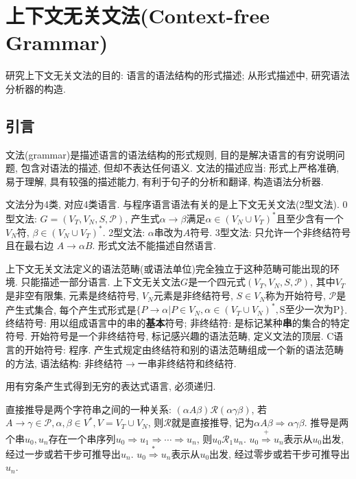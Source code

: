 \section{上下文无关文法(Context-free Grammar)}

    研究上下文无关文法的目的: 语言的语法结构的形式描述; 从形式描述中, 研究语法分析器的构造.

    \subsection{引言}

        \textsf{文法(grammar)}是描述语言的语法结构的形式规则, 目的是解决语言的有穷说明问题, 包含对语法的描述, 但却不表达任何语义. 文法的描述应当: 形式上严格准确, 易于理解, 具有较强的描述能力, 有利于句子的分析和翻译, 构造语法分析器.

        文法分为4类, 对应4类语言. 与程序语言语法有关的是上下文无关文法(2型文法). 0型文法: $G=(V_T, V_N, S, \mathcal{P})$, 产生式$\alpha\to\beta$满足$\alpha\in(V_N\cup V_T)^*$且至少含有一个$V_N$符, $\beta\in(V_N\cup V_T)^*$. 2型文法: $\alpha$串改为$A$符号. 3型文法: 只允许一个非终结符号且在最右边 $A\to\alpha B$. 形式文法不能描述自然语言.

        \textsf{上下文无关文法}定义的语法范畴(或语法单位)完全独立于这种范畴可能出现的环境. 只能描述一部分语言. 上下文无关文法$G$是一个四元式$(V_T,V_N,S,\mathcal{P})$, 其中$V_T$是非空有限集, 元素是终结符号, $V_N$元素是非终结符号, $S\in V_N$称为开始符号, $\mathcal{P}$是产生式集合, 每个产生式形式是$\{P\to\alpha|P\in V_N, \alpha\in(V_T\cup V_N)^*, \textrm{S至少一次为P}\}$. \textsf{终结符号}: 用以组成语言中的串的\textbf{基本}符号; \textsf{非终结符}: 是标记某种\textbf{串}的集合的特定符号. \textsf{开始符号}是一个非终结符号, 标记感兴趣的语法范畴, 定义文法的顶层. C语言的开始符号: 程序. \textsf{产生式}规定由终结符和别的语法范畴组成一个新的语法范畴的方法, 语法结构: 非终结符$\to$一串非终结符和终结符. 

        用有穷条产生式得到无穷的表达式语言, 必须递归.

        \textsf{直接推导}是两个字符串之间的一种关系: $(\alpha A\beta)\mathcal{R}(\alpha\gamma\beta)$, 若$A\to\gamma\in\mathcal{P}, \alpha, \beta\in V^*, V=V_T\cup V_N$, 则$\mathcal{R}$就是直接推导, 记为$\alpha A\beta\Rightarrow\alpha\gamma\beta$. \textsf{推导}是两个串$u_0, u_n$存在一个串序列$u_0\Rightarrow u_1\Rightarrow \cdots\Rightarrow u_n$, 则$u_0\mathcal{R}_1u_n$. $u_0\stackrel{+}{\Rightarrow}u_n$表示从$u_0$出发, 经过一步或若干步可推导出$u_n$. $u_0\stackrel{*}{\Rightarrow}u_n$表示从$u_0$出发, 经过零步或若干步可推导出$u_n$. 

